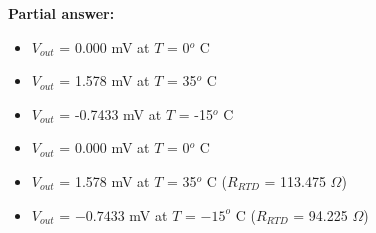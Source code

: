 





\noindent
{\bf Partial answer:}

\begin{itemize}
\item{} $V_{out}$ = 0.000 mV at $T$ = 0$^{o}$ C
\vskip 5pt
\item{} $V_{out}$ = 1.578 mV at $T$ = 35$^{o}$ C
\vskip 5pt
\item{} $V_{out}$ = -0.7433 mV at $T$ = -15$^{o}$ C
\end{itemize}







\begin{itemize}
\item{} $V_{out}$ = 0.000 mV at $T$ = 0$^{o}$ C
\vskip 5pt
\item{} $V_{out}$ = 1.578 mV at $T$ = 35$^{o}$ C  ($R_{RTD}$ = 113.475 $\Omega$)
\vskip 5pt
\item{} $V_{out}$ = $-0.7433$ mV at $T$ = $-15^{o}$ C  ($R_{RTD}$ = 94.225 $\Omega$)
\end{itemize}





